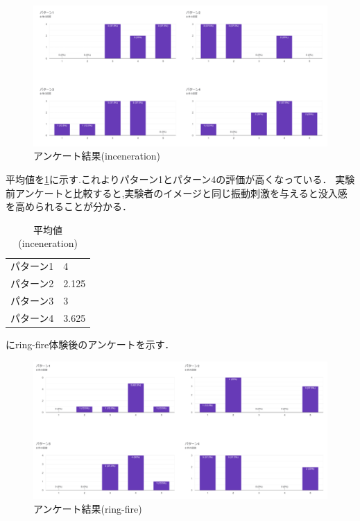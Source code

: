 \begin{figure}[h]
  \centering
  \includegraphics[clip,width=14cm]{./fig/incenerationAnk.png}
  \caption{アンケート結果(inceneration)}\label{inceAnk}
  \end{figure}
  


平均値を\ref{tab;inceAvera}に示す.これよりパターン1とパターン4の評価が高くなっている．
実験前アンケートと比較すると,実験者のイメージと同じ振動刺激を与えると没入感を高められることが分かる．
\begin{table}[h]
    \caption{平均値(inceneration)}
    \centering
    \begin{tabular}{l|l}
    \hline
    \hline
    パターン1 & 4\\
    パターン2 & 2.125\\
    パターン3 & 3\\
    パターン4 & 3.625\\
    \hline
    \end{tabular}
    \label{tab;inceAvera}
\end{table}

\newpage

にring-fire体験後のアンケートを示す．

\begin{figure}[h]
  \centering
  \includegraphics[clip,width=14cm]{fig/ringfireAnk.png}
  \caption{アンケート結果(ring-fire)}\label{ringAnk}
  \end{figure}


